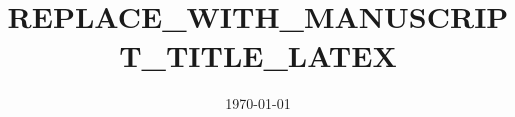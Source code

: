 \documentclass{article}
\begin{document}
\title{REPLACE_WITH_MANUSCRIPT_TITLE_LATEX}
\author{}
\date{\today}
\maketitle

\begin{abstract}
\end{abstract}







% 


\end{document}

